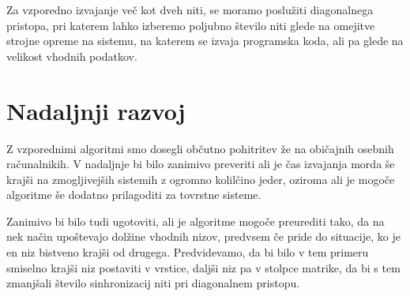 \documentclass[a4paper,12pt,openright]{book}
\begin{document}
Za vzporedno izvajanje več kot dveh niti, se moramo poslužiti diagonalnega pristopa, pri katerem lahko izberemo poljubno število niti glede na omejitve strojne opreme na sistemu, na katerem se izvaja programska koda, ali pa glede na velikost vhodnih podatkov. 

\section{Nadaljnji razvoj}

Z vzporednimi algoritmi smo dosegli občutno pohitritev že na običajnih osebnih računalnikih. V nadaljnje bi bilo zanimivo preveriti ali je čas izvajanja morda še krajši na zmogljivejših sistemih z ogromno kolilčino jeder, oziroma ali je mogoče algoritme še dodatno prilagoditi za tovrstne sisteme. 

Zanimivo bi bilo tudi ugotoviti, ali je algoritme mogoče preurediti tako, da na nek način upoštevajo dolžine vhodnih nizov, predvsem če pride do situacije, ko je en niz bistveno krajši od drugega. Predvidevamo, da bi bilo v tem primeru smiselno krajši niz postaviti v vrstice, daljši niz pa v stolpce matrike, da bi s tem zmanjšali število sinhronizacij niti pri diagonalnem pristopu. 




\raggedright




\printbibliography[heading=bibintoc,title={Literatura}]
\end{document}
